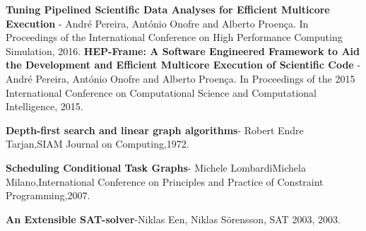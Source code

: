 \documentclass[
  twoside,
  11pt, a4paper,
  footinclude=true,
  headinclude=true,
  cleardoublepage=empty
]{scrbook}
\begin{document}







\textbf{Tuning Pipelined Scientific Data Analyses for Efficient Multicore Execution} - André Pereira, António Onofre and Alberto Proença. In Proceedings of the International Conference on High Performance Computing Simulation, 2016.
\bigbreak
{\setlength{\parindent}{0cm}
\textbf{HEP-Frame: A Software Engineered Framework to Aid the Development and Efficient Multicore Execution of Scientific Code} - André Pereira, António Onofre and Alberto Proença. In Proceedings of the 2015 International Conference on Computational Science and Computational Intelligence, 2015. 
}

\bigbreak
{\setlength{\parindent}{0cm}
\textbf{Depth-first search and linear graph algorithms}- Robert Endre Tarjan,SIAM Journal on Computing,1972.
}

\bigbreak
{\setlength{\parindent}{0cm}
\textbf{Scheduling Conditional Task Graphs}- Michele LombardiMichela Milano,International Conference on Principles and Practice of Constraint Programming,2007.
}

\bigbreak
{\setlength{\parindent}{0cm}
\textbf{ An Extensible SAT-solver}-Niklas Een, Niklas Sörensson, SAT 2003, 2003. 
}
	
\end{document}

